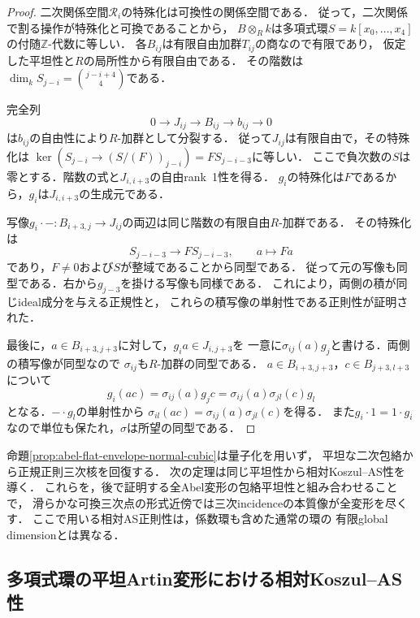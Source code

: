 \begin{proof}
二次関係空間$\mathcal R_i$の特殊化は可換性の関係空間である．
従って，二次関係で割る操作が特殊化と可換であることから，
$B\otimes_R k$は多項式環$S=k[x_0,\ldots,x_4]$の付随$\mathbb Z$-代数に等しい．
各$B_{ij}$は有限自由加群$T_{ij}$の商なので有限であり，
仮定した平坦性と$R$の局所性から有限自由である．
その階数は$\dim_k S_{j-i}=\binom{j-i+4}{4}$である．

完全列
\[
 0\longrightarrow J_{ij}\longrightarrow B_{ij}
 \longrightarrow b_{ij}\longrightarrow0
\]
は$b_{ij}$の自由性により$R$-加群として分裂する．
従って$J_{ij}$は有限自由で，その特殊化は
$\ker(S_{j-i}\to(S/(F))_{j-i})=F S_{j-i-3}$に等しい．
ここで負次数の$S$は零とする．階数の式と$J_{i,i+3}$の自由rank~1性を得る．
$g_i$の特殊化は$F$であるから，$g_i$は$J_{i,i+3}$の生成元である．

写像$g_i\cdot-:B_{i+3,j}\to J_{ij}$の両辺は同じ階数の有限自由$R$-加群である．
その特殊化は
\[
 S_{j-i-3}\longrightarrow F S_{j-i-3},\qquad a\longmapsto Fa
\]
であり，$F\neq0$および$S$が整域であることから同型である．
従って元の写像も同型である．右から$g_{j-3}$を掛ける写像も同様である．
これにより，両側の積が同じideal成分を与える正規性と，
これらの積写像の単射性である正則性が証明された．

最後に，$a\in B_{i+3,j+3}$に対して，$g_i a\in J_{i,j+3}$を
一意に$\sigma_{ij}(a)g_j$と書ける．両側の積写像が同型なので
$\sigma_{ij}$も$R$-加群の同型である．
$a\in B_{i+3,j+3}$，$c\in B_{j+3,l+3}$について
\[
 g_i(ac)=\sigma_{ij}(a)g_jc
        =\sigma_{ij}(a)\sigma_{jl}(c)g_l
\]
となる．$-\cdot g_l$の単射性から
$\sigma_{il}(ac)=\sigma_{ij}(a)\sigma_{jl}(c)$を得る．
また$g_i\cdot1=1\cdot g_i$なので単位も保たれ，$\sigma$は所望の同型である．
\end{proof}

\begin{remark}
命題\ref{prop:abel-flat-envelope-normal-cubic}は量子化を用いず，
平坦な二次包絡から正規正則三次核を回復する．
次の定理は同じ平坦性から相対Koszul--AS性を導く．
これらを，後で証明する全Abel変形の包絡平坦性と組み合わせることで，
滑らかな可換三次点の形式近傍では三次incidenceの本質像が全変形を尽くす．
ここで用いる相対AS正則性は，係数環も含めた通常の環の
有限global dimensionとは異なる．
\end{remark}

\subsection{多項式環の平坦Artin変形における相対Koszul--AS性}
\label{subsec:abel-relative-as-lifting}

